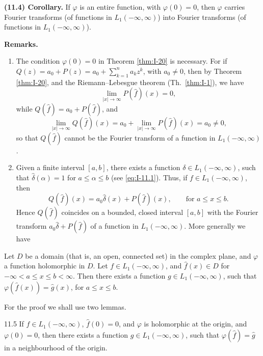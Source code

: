 \noindent\textbf{(11.4) Corollary.}
If $\varphi$ is an entire function, with $\varphi(0)=0$, then $\varphi$ carries Fourier transforms (of functions in $L_1(-\infty,\infty)$) into Fourier transforms (of functions in $L_1(-\infty,\infty)$).

\noindent\textbf{Remarks.}
\begin{enumerate}[label=\arabic*.,ref=\arabic*]
\item The condition $\varphi(0)=0$ in Theorem \ref{thm:I-20} is necessary. For if $Q(z)=a_0+P(z)=a_0+\sum_{k=1}^{n}a_kz^k$, with $a_0\neq 0$, then by Theorem \ref{thm:I-20}, and the Riemann--Lebesgue theorem (Th.~\ref{thm:I-1}), we have
\begin{equation*}
\lim_{|x|\to\infty}P(\widehat f)(x)=0,
\end{equation*}
while $Q(\widehat f)=a_0+P(\widehat f)$, and
\begin{equation*}
\lim_{|x|\to\infty}Q(\widehat f)(x)=a_0+\lim_{|x|\to\infty}P(\widehat f)(x)=a_0\neq 0,
\end{equation*}
so that $Q(\widehat f)$ cannot be the Fourier transform of a function in $L_1(-\infty,\infty)$.

\item Given a finite interval $[a,b]$, there exists a function $\delta\in L_1(-\infty,\infty)$, such that $\widehat\delta(\alpha)=1$ for $a\le\alpha\le b$ (see \eqref{eq:I-11.1}). Thus, if $f\in L_1(-\infty,\infty)$, then
\begin{equation*}
Q(\widehat f)(x)=a_0\widehat\delta(x)+P(\widehat f)(x),\qquad\text{for }a\le x\le b.
\end{equation*}
Hence $Q(\widehat f)$ coincides on a bounded, closed interval $[a,b]$ with the Fourier transform $a_0\widehat\delta+P(\widehat f)$ of a function in $L_1(-\infty,\infty)$. More generally we have
\end{enumerate}

\begin{theorem}\label{thm:I-21}
Let $D$ be a domain (that is, an open, connected set) in the complex plane, and $\varphi$ a function holomorphic in $D$. Let $f\in L_1(-\infty,\infty)$, and $\widehat f(x)\in D$ for $-\infty<a\le x\le b<\infty$. Then there exists a function $g\in L_1(-\infty,\infty)$, such that $\varphi(\widehat f(x))=\widehat g(x)$, for $a\le x\le b$.
\end{theorem}

For the proof we shall use two lemmas.

\begin{nstmt}{11.5}\label{eq:I-11.5}
If $f\in L_1(-\infty,\infty)$, $\widehat f(0)=0$, and $\varphi$ is holomorphic at the origin, and $\varphi(0)=0$, then there exists a function $g\in L_1(-\infty,\infty)$, such that $\varphi(\widehat f)=\widehat g$ in a neighbourhood of the origin.
\end{nstmt}


